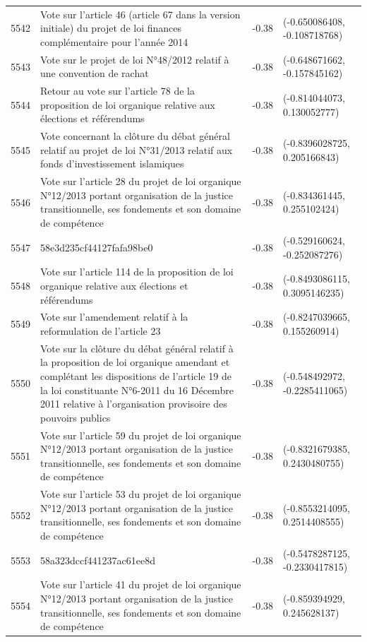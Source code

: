 \begin{table}[ht]
\begin{tabular}{rlrl}
  5542 & Vote sur l'article 46 (article 67 dans la version initiale) du projet de loi finances complémentaire pour l'année 2014 & -0.38 & (-0.650086408, -0.108718768) \\ 
  5543 & Vote sur le projet de loi N°48/2012 relatif à une convention de rachat & -0.38 & (-0.648671662, -0.157845162) \\ 
  5544 & Retour au vote sur l'article 78 de la proposition de loi organique relative aux élections et référendums & -0.38 & (-0.814044073, 0.130052777) \\ 
  5545 & Vote concernant la clôture du débat général relatif au projet de loi N°31/2013 relatif aux fonds d'investissement islamiques & -0.38 & (-0.8396028725, 0.205166843) \\ 
  5546 & Vote sur l'article 28 du projet de loi organique N°12/2013 portant organisation de la justice transitionnelle, ses fondements et son domaine de compétence & -0.38 & (-0.834361445, 0.255102424) \\ 
  5547 & 58e3d235cf44127fafa98be0 & -0.38 & (-0.529160624, -0.252087276) \\ 
  5548 & Vote sur l'article 114 de la proposition de loi organique relative aux élections et référendums & -0.38 & (-0.8493086115, 0.3095146235) \\ 
  5549 & Vote sur l'amendement relatif à la reformulation de l'article 23 & -0.38 & (-0.8247039665, 0.155260914) \\ 
  5550 & Vote sur la clôture du débat général relatif à la proposition de loi organique amendant et complétant les dispositions de l'article 19 de la loi constituante N°6-2011 du 16 Décembre 2011 relative à l'organisation provisoire des pouvoirs publics & -0.38 & (-0.548492972, -0.2285411065) \\ 
  5551 & Vote sur l'article 59 du projet de loi organique N°12/2013 portant organisation de la justice transitionnelle, ses fondements et son domaine de compétence & -0.38 & (-0.8321679385, 0.2430480755) \\ 
  5552 & Vote sur l'article 53 du projet de loi organique N°12/2013 portant organisation de la justice transitionnelle, ses fondements et son domaine de compétence & -0.38 & (-0.8553214095, 0.2514408555) \\ 
  5553 & 58a323dccf441237ac61ee8d & -0.38 & (-0.5478287125, -0.2330417815) \\ 
  5554 & Vote sur l'article 41 du projet de loi organique N°12/2013 portant organisation de la justice transitionnelle, ses fondements et son domaine de compétence & -0.38 & (-0.859394929, 0.245628137) \\ 

\end{tabular}
\end{table}
